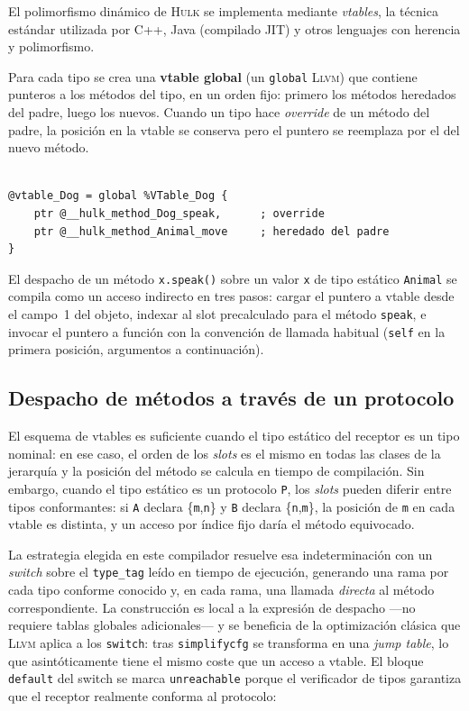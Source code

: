 \documentclass[11pt,a4paper,oneside,openany]{report}
\newcommand{\hulk}{\textsc{Hulk}}
\newcommand{\code}[1]{\texttt{#1}}
\newcommand{\llvm}{\textsc{Llvm}}
\begin{document}
El polimorfismo dinámico de \hulk{} se implementa mediante \textit{vtables}, la
técnica estándar utilizada por C++, Java (compilado JIT) y otros lenguajes con
herencia y polimorfismo.

Para cada tipo se crea una \textbf{vtable global} (un \code{global} \llvm{}) que
contiene punteros a los métodos del tipo, en un orden fijo: primero los métodos
heredados del padre, luego los nuevos. Cuando un tipo hace \textit{override} de un
método del padre, la posición en la vtable se conserva pero el puntero se
reemplaza por el del nuevo método.

\begin{lstlisting}[style=llvmst, caption={Vtable global para un tipo \code{Dog} que
  redefine \code{speak} y hereda \code{move}.}, label={lst:vtable}]
%VTable_Dog = type { ptr, ptr }

@vtable_Dog = global %VTable_Dog {
    ptr @__hulk_method_Dog_speak,      ; override
    ptr @__hulk_method_Animal_move     ; heredado del padre
}
\end{lstlisting}

El despacho de un método \code{x.speak()} sobre un valor \code{x} de tipo estático
\code{Animal} se compila como un acceso indirecto en tres pasos: cargar el puntero
a vtable desde el campo~1 del objeto, indexar al slot precalculado para el método
\code{speak}, e invocar el puntero a función con la convención de llamada habitual
(\code{self} en la primera posición, argumentos a continuación).

\subsection{Despacho de métodos a través de un protocolo}

El esquema de vtables es suficiente cuando el tipo estático del receptor es un tipo
nominal: en ese caso, el orden de los \textit{slots} es el mismo en todas las
clases de la jerarquía y la posición del método se calcula en tiempo de
compilación. Sin embargo, cuando el tipo estático es un protocolo \code{P}, los
\textit{slots} pueden diferir entre tipos conformantes: si \code{A} declara
\{\code{m},\code{n}\} y \code{B} declara \{\code{n},\code{m}\}, la posición de
\code{m} en cada vtable es distinta, y un acceso por índice fijo daría el método
equivocado.

La estrategia elegida en este compilador resuelve esa indeterminación con un
\textit{switch} sobre el \code{type\_tag} leído en tiempo de ejecución, generando
una rama por cada tipo conforme conocido y, en cada rama, una llamada
\emph{directa} al método correspondiente. La construcción es local a la expresión
de despacho ---no requiere tablas globales adicionales--- y se beneficia de la
optimización clásica que \llvm{} aplica a los \code{switch}: tras \code{simplifycfg}
se transforma en una \textit{jump table}, lo que asintóticamente tiene el mismo
coste que un acceso a vtable. El bloque \code{default} del switch se marca
\code{unreachable} porque el verificador de tipos garantiza que el receptor
realmente conforma al protocolo:
\end{document}
